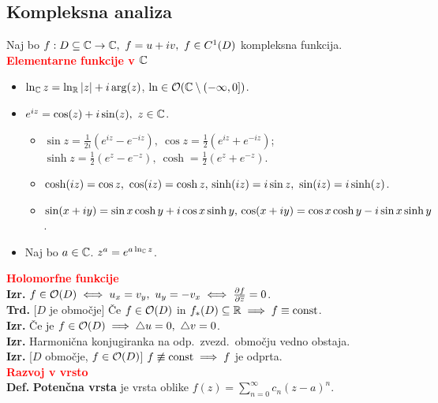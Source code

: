 \documentclass[a4paper,oneside,8pt,landscape]{extarticle}
\begin{document}
\begin{multicols*}{3}

\section{Kompleksna analiza}
Naj bo \(f: D \subseteq \mathbb{C} \to \mathbb{C}, \ f = u+iv, \ f \in C^1(D)\) kompleksna funkcija.\\
%
\textbf{\textcolor{red}{Elementarne funkcije v \(\mathbb{C}\)}}
%
\begin{itemize}
    \item \(\ln_{\mathbb{C}} z = \ln_{\mathbb{R}} |z| + i \arg (z)\), \(\ln \in \mathcal{O}(\mathbb{C} \setminus (-\infty, 0])\).
    \item \(e^{iz} = \cos (z) + i\sin (z), \ z \in \mathbb{C}\).
    \begin{itemize}
        \item \(\sin z = \frac{1}{2i}(e^{iz} - e^{-iz}),\ \cos z = \frac{1}{2} (e^{iz} + e^{-iz})\); \\
        \(\sinh z = \frac{1}{2} (e^z - e^{-z}), \ \cosh = \frac{1}{2}(e^z + e^{-z})\).
        \item  \(\cosh(iz) = \cos z,\ \cos(iz) = \cosh z,\\ \sinh(iz) = i\sin z,\ \sin(iz) = i \sinh(z)\).
        \item \(\sin(x+iy) = \sin x \cosh y + i \cos x \sinh y, \\
        \cos(x+ iy) = \cos x \cosh y - i \sin x \sinh y\).
    \end{itemize}
    \item Naj bo \(a \in \mathbb{C}\). \(z^a = e^{a \ln_{\mathbb{C}} z}\).
\end{itemize}
%
\textbf{\textcolor{red}{Holomorfne funkcije}}\\
\textbf{Izr.} \(f \in \mathcal{O}(D) \iff u_x = v_y, \ u_y = -v_x \iff \frac{\partial f}{\partial \overline{z}} = 0\). \\
\textbf{Trd.} [\(D\) je območje] Če \(f \in \mathcal{O}(D)\) in \(f_{*}(D) \subseteq \mathbb{R} \implies f \equiv \text{const}\). \\
\textbf{Izr.} Če je \(f \in \mathcal{O}(D) \implies \triangle u = 0, \ \triangle v = 0\). \\
\textbf{Izr.} Harmonična konjugiranka na odp.\ zvezd.\ območju vedno obstaja.\\
\textbf{Izr.} [\(D\) območje, \(f \in \mathcal{O}(D)\)] \(f \not \equiv \text{const} \implies f \) je odprta.\\
%
\textbf{\textcolor{red}{Razvoj v vrsto}}\\
\textbf{Def.} \textbf{Potenčna vrsta} je vrsta oblike \(f(z) = \sum_{n=0}^{\infty} c_n(z-a)^n\).\\

\end{multicols*}
\end{document}
